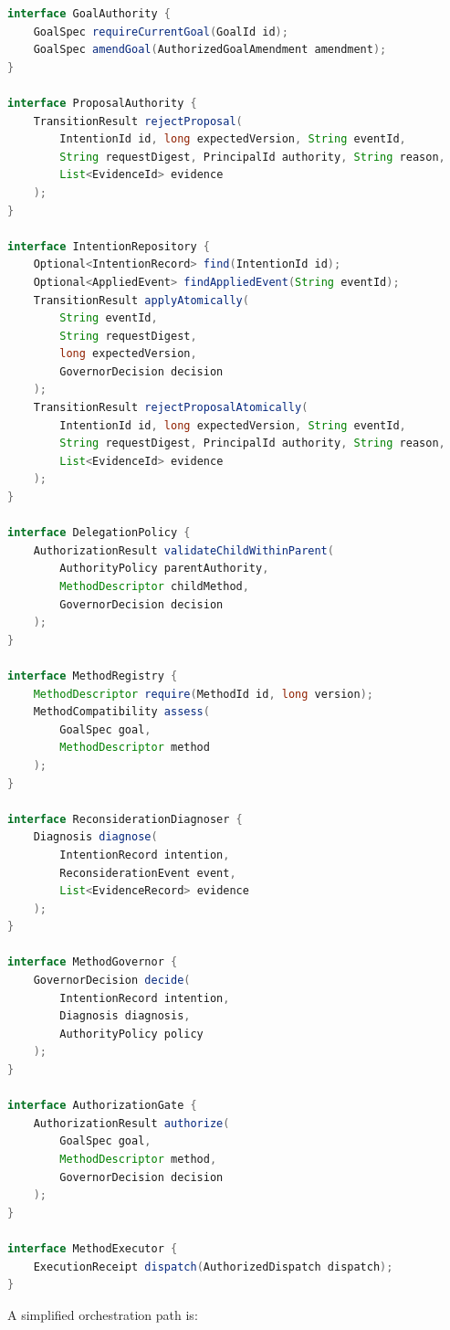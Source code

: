 \begin{lstlisting}[language=Java,caption={Proposed service boundaries for intention governance},label={lst:ch15-interfaces}]
interface GoalAuthority {
    GoalSpec requireCurrentGoal(GoalId id);
    GoalSpec amendGoal(AuthorizedGoalAmendment amendment);
}

interface ProposalAuthority {
    TransitionResult rejectProposal(
        IntentionId id, long expectedVersion, String eventId,
        String requestDigest, PrincipalId authority, String reason,
        List<EvidenceId> evidence
    );
}

interface IntentionRepository {
    Optional<IntentionRecord> find(IntentionId id);
    Optional<AppliedEvent> findAppliedEvent(String eventId);
    TransitionResult applyAtomically(
        String eventId,
        String requestDigest,
        long expectedVersion,
        GovernorDecision decision
    );
    TransitionResult rejectProposalAtomically(
        IntentionId id, long expectedVersion, String eventId,
        String requestDigest, PrincipalId authority, String reason,
        List<EvidenceId> evidence
    );
}

interface DelegationPolicy {
    AuthorizationResult validateChildWithinParent(
        AuthorityPolicy parentAuthority,
        MethodDescriptor childMethod,
        GovernorDecision decision
    );
}

interface MethodRegistry {
    MethodDescriptor require(MethodId id, long version);
    MethodCompatibility assess(
        GoalSpec goal,
        MethodDescriptor method
    );
}

interface ReconsiderationDiagnoser {
    Diagnosis diagnose(
        IntentionRecord intention,
        ReconsiderationEvent event,
        List<EvidenceRecord> evidence
    );
}

interface MethodGovernor {
    GovernorDecision decide(
        IntentionRecord intention,
        Diagnosis diagnosis,
        AuthorityPolicy policy
    );
}

interface AuthorizationGate {
    AuthorizationResult authorize(
        GoalSpec goal,
        MethodDescriptor method,
        GovernorDecision decision
    );
}

interface MethodExecutor {
    ExecutionReceipt dispatch(AuthorizedDispatch dispatch);
}
\end{lstlisting}

A simplified orchestration path is:

